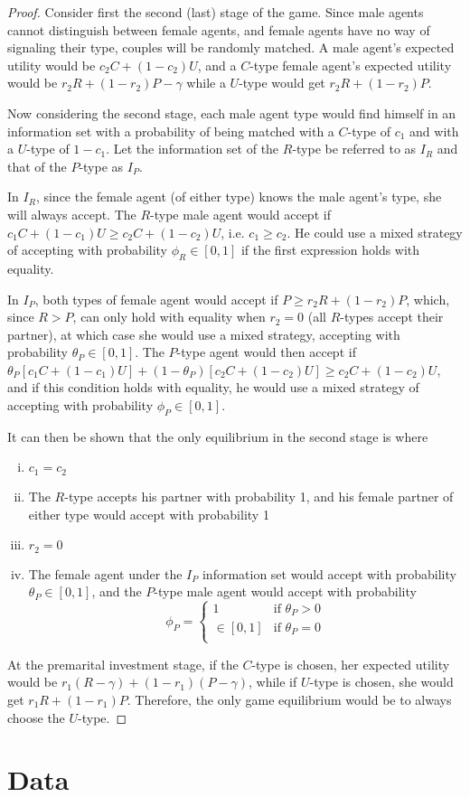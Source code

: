 \documentclass[12pt]{article}
\begin{document}
\begin{proof}
  Consider first the second (last) stage of the game.  Since male agents cannot distinguish between female agents, and female agents have no way of signaling their type, couples will be randomly matched.  A male agent's expected utility would be $c_2 C + (1-c_2)U $, and a $C$-type female agent's expected utility would be $r_2 R + (1 - r_2) P - \gamma$ while a $U$-type would get $r_2 R + (1 - r_2) P$.

  Now considering the second stage, each male agent type would find himself in an information set with a probability of being matched with a $C$-type of $c_1$ and with a $U$-type of $1-c_1$. Let the information set of the $R$-type be referred to as $I_R$ and that of the $P$-type as $I_P$.

  In $I_R$, since the female agent (of either type) knows the male agent's type, she will always accept. The $R$-type male agent would accept if $c_1 C + (1 - c_1)U \geq c_2C + (1-c_2)U$, i.e. $c_1 \geq c_2$.  He could use a mixed strategy of accepting with probability $\phi_R \in [0,1]$ if the first expression holds with equality.

  In $I_P$, both types of female agent would accept if $P \geq r_2R + (1-r_2)P$, which, since $R > P$, can only hold with equality when $r_2 = 0$ (all $R$-types accept their partner), at which case she would use a mixed strategy, accepting with probability $\theta_P \in [0,1]$. The $P$-type agent would then accept if $\theta_P[c_1C + (1-c_1)U] + (1-\theta_P)[c_2C + (1-c_2)U] \geq c_2C + (1-c_2)U$, and if this condition holds with equality, he would use a mixed strategy of accepting with probability $\phi_P \in [0,1]$.

  It can then be shown that the only equilibrium in the second stage is where
    \begin{enumerate}[i.]
      \item $c_1 = c_2$
      \item The $R$-type accepts his partner with probability 1, and his female partner of either type would accept with probability 1
      \item $r_2 = 0$
      \item The female agent under the $I_P$ information set would accept with probability $\theta_P \in [0,1]$, and the $P$-type male agent would accept with probability 
        \[\phi_P = \left\{
            \begin{array}{rl}
              1 & \text{if } \theta_P > 0 \\
              \in[0,1] & \text{if } \theta_P = 0\\
            \end{array} \right.\]
    \end{enumerate}

  At the premarital investment stage, if the $C$-type is chosen, her expected utility would be $r_1(R-\gamma) + (1-r_1)(P-\gamma)$, while if $U$-type is chosen, she would get $r_1R + (1-r_1)P$. Therefore, the only game equilibrium would be to always choose the $U$-type.

\end{proof}

\section{Data}\label{sec:data}



\end{document}
